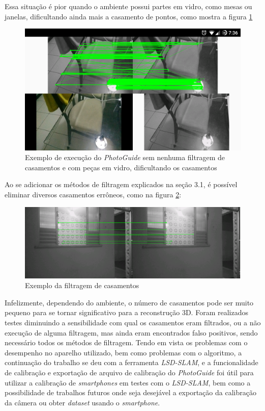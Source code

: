 Essa situação é pior quando o ambiente possui partes em vidro, como mesas ou janelas, dificultando ainda mais a casamento de pontos, como mostra a figura \ref{fig4:3}

\begin{figure}[H]
	\centering
		\includegraphics[width= \textwidth]{Imagens/figura4-3.png}
	\caption{Exemplo de execução do \textit{PhotoGuide} sem nenhuma filtragem de casamentos e com peças em vidro, dificultando os casamentos}
	\label{fig4:3}
\end{figure}

Ao se adicionar os métodos de filtragem explicados na seção 3.1, é possível eliminar diversos casamentos errôneos, como na figura \ref{fig4:4}:

\begin{figure}[H]
	\centering
		\includegraphics[width= \textwidth]{Imagens/figura3-2E4-4.png}
	\caption{Exemplo da filtragem de casamentos}
	\label{fig4:4}
\end{figure}

Infelizmente, dependendo do ambiente, o número de casamentos pode ser muito pequeno para se tornar significativo para a reconstrução 3D. Foram realizados testes diminuindo a sensibilidade com qual os casamentos eram filtrados, ou a não execução de alguma filtragem, mas ainda eram encontrados falso positivos, sendo necessário todos os métodos de filtragem. 
	Tendo em vista os problemas com o desempenho no aparelho utilizado, bem como problemas com o algoritmo, a continuação do trabalho se deu com a ferramenta \textit{LSD-SLAM}, e a funcionalidade de calibração e exportação de arquivo de calibração do \textit{PhotoGuide} foi útil para utilizar a calibração de \textit{smartphones} em testes com o \textit{LSD-SLAM}, bem como a possibilidade de trabalhos futuros onde seja desejável a exportação da calibração da câmera ou obter \textit{dataset} usando o \textit{smartphone}.
	
